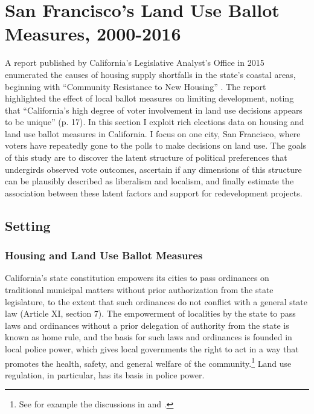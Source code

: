 \documentclass[article,11pt]{memoir}
\begin{document}
\section{San Francisco's Land Use Ballot Measures, 2000-2016}\label{sec:sf}

A report published by California's Legislative Analyst's Office in 2015 enumerated the causes of housing supply shortfalls in the state's coastal areas, beginning with ``Community Resistance to New Housing'' \citep{alamo_californias_2015}.  The report highlighted the effect of local ballot measures on limiting development, noting that ``California's high degree of voter involvement in land use decisions appears to be unique'' (p. 17).  In this section I exploit rich elections data on housing and land use ballot measures in California.  I focus on one city, San Francisco, where voters have repeatedly gone to the polls to make decisions on land use.  The goals of this study are to discover the latent structure of political preferences that undergirds observed vote outcomes, ascertain if any dimensions of this structure can be plausibly described as liberalism and localism, and finally estimate the association between these latent factors and support for redevelopment projects.

\subsection{Setting}

\subsubsection{Housing and Land Use Ballot Measures}

California's state constitution empowers its cities to pass ordinances on traditional municipal matters without prior authorization from the state legislature, to the extent that such ordinances do not conflict with a general state law (Article XI, section 7).  The empowerment of localities by the state to pass laws and ordinances without a prior delegation of authority from the state is known as home rule, and the basis for such laws and ordinances is founded in local police power, which gives local governments the right to act in a way that promotes the health, safety, and general welfare of the community.\footnote{See for example the discussions in \citet[pp.19ff]{fischel_homevoter_2001} and \citet[pp.70ff]{berman_local_2015}.}  Land use regulation, in particular, has its basis in police power.  
\end{document}
